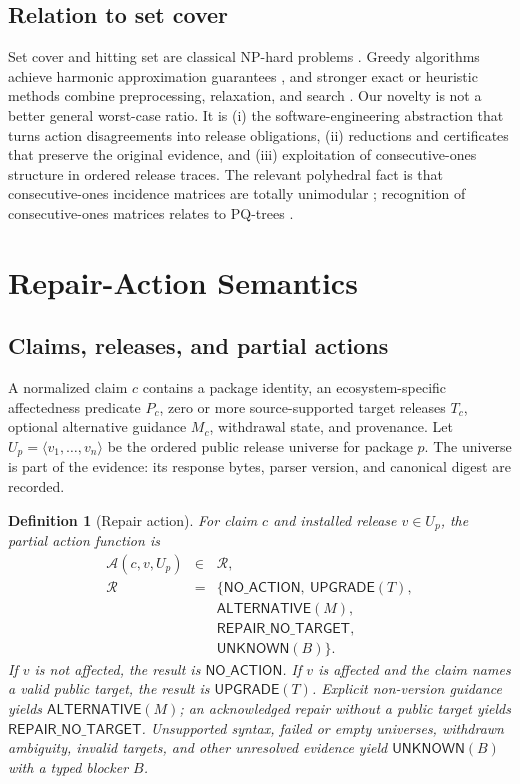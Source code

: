 \documentclass[10pt,conference]{IEEEtran}
\newtheorem{definition}{Definition}
\newcommand{\Act}{\mathcal{A}}
\newcommand{\unknown}{\ensuremath{\mathsf{UNKNOWN}}}
\newcommand{\noaction}{\ensuremath{\mathsf{NO\_ACTION}}}
\newcommand{\upgrade}{\ensuremath{\mathsf{UPGRADE}}}
\newcommand{\alternative}{\ensuremath{\mathsf{ALTERNATIVE}}}
\newcommand{\notarget}{\ensuremath{\mathsf{REPAIR\_NO\_TARGET}}}
\begin{document}
\subsection{Relation to set cover}
Set cover and hitting set are classical NP-hard problems \cite{karp1972reducibility,garey1979computers}. Greedy algorithms achieve harmonic approximation guarantees \cite{johnson1974approximation,chvatal1979greedy,wolsey1982submodular,slavik1997tight}, and stronger exact or heuristic methods combine preprocessing, relaxation, and search \cite{balas1980setcover,caprara1999heuristic,rajagopalan1999primal}. Our novelty is not a better general worst-case ratio. It is (i) the software-engineering abstraction that turns action disagreements into release obligations, (ii) reductions and certificates that preserve the original evidence, and (iii) exploitation of consecutive-ones structure in ordered release traces. The relevant polyhedral fact is that consecutive-ones incidence matrices are totally unimodular \cite{fulkerson1965interval}; recognition of consecutive-ones matrices relates to PQ-trees \cite{booth1976pqtree}.

\section{Repair-Action Semantics}
\subsection{Claims, releases, and partial actions}
A normalized claim $c$ contains a package identity, an ecosystem-specific affectedness predicate $P_c$, zero or more source-supported target releases $T_c$, optional alternative guidance $M_c$, withdrawal state, and provenance. Let $U_p=\langle v_1,\ldots,v_n\rangle$ be the ordered public release universe for package $p$. The universe is part of the evidence: its response bytes, parser version, and canonical digest are recorded.

\begin{definition}[Repair action]
For claim $c$ and installed release $v\in U_p$, the partial action function is
\[
\begin{array}{rcl}
\Act(c,v,U_p) &\in& \mathcal{R},\\
\mathcal{R} &=&
\{\noaction,\ \upgrade(T),\\
&& \alternative(M),\\
&& \notarget,\\
&& \unknown(B)\}.
\end{array}
\]
If $v$ is not affected, the result is $\noaction$. If $v$ is affected and the claim names a valid public target, the result is $\upgrade(T)$. Explicit non-version guidance yields $\alternative(M)$; an acknowledged repair without a public target yields $\notarget$. Unsupported syntax, failed or empty universes, withdrawn ambiguity, invalid targets, and other unresolved evidence yield $\unknown(B)$ with a typed blocker $B$.
\end{definition}
\end{document}
